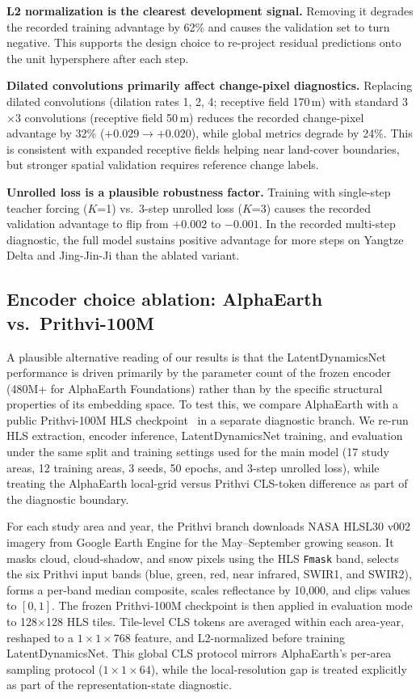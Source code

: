 \documentclass{article}
\begin{document}
\textbf{L2 normalization is the clearest development signal.} Removing it degrades the recorded training advantage by 62\% and causes the validation set to turn negative. This supports the design choice to re-project residual predictions onto the unit hypersphere after each step.

\textbf{Dilated convolutions primarily affect change-pixel diagnostics.} Replacing dilated convolutions (dilation rates 1, 2, 4; receptive field 170\,m) with standard 3$\times$3 convolutions (receptive field 50\,m) reduces the recorded change-pixel advantage by 32\% ($+0.029 \to +0.020$), while global metrics degrade by 24\%. This is consistent with expanded receptive fields helping near land-cover boundaries, but stronger spatial validation requires reference change labels.

\textbf{Unrolled loss is a plausible robustness factor.} Training with single-step teacher forcing ($K$=1) vs.\ 3-step unrolled loss ($K$=3) causes the recorded validation advantage to flip from $+0.002$ to $-0.001$. In the recorded multi-step diagnostic, the full model sustains positive advantage for more steps on Yangtze Delta and Jing-Jin-Ji than the ablated variant.

\subsection{Encoder choice ablation: AlphaEarth vs.\ Prithvi-100M}
\label{sec:encoder_ablation}

A plausible alternative reading of our results is that the LatentDynamicsNet performance is driven primarily by the parameter count of the frozen encoder (480M+ for AlphaEarth Foundations) rather than by the specific structural properties of its embedding space. To test this, we compare AlphaEarth with a public Prithvi-100M HLS checkpoint~\citep{jakubik2024prithvi} in a separate diagnostic branch. We re-run HLS extraction, encoder inference, LatentDynamicsNet training, and evaluation under the same split and training settings used for the main model (17 study areas, 12 training areas, 3 seeds, 50 epochs, and 3-step unrolled loss), while treating the AlphaEarth local-grid versus Prithvi CLS-token difference as part of the diagnostic boundary.

For each study area and year, the Prithvi branch downloads NASA HLSL30 v002 imagery from Google Earth Engine for the May--September growing season. It masks cloud, cloud-shadow, and snow pixels using the HLS \texttt{Fmask} band, selects the six Prithvi input bands (blue, green, red, near infrared, SWIR1, and SWIR2), forms a per-band median composite, scales reflectance by 10{,}000, and clips values to $[0,1]$. The frozen Prithvi-100M checkpoint is then applied in evaluation mode to 128$\times$128 HLS tiles. Tile-level CLS tokens are averaged within each area-year, reshaped to a $1 \times 1 \times 768$ feature, and L2-normalized before training LatentDynamicsNet. This global CLS protocol mirrors AlphaEarth's per-area sampling protocol ($1 \times 1 \times 64$), while the local-resolution gap is treated explicitly as part of the representation-state diagnostic.
\end{document}
